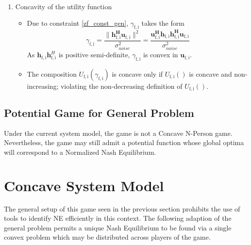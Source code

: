 \documentclass[12pt,a4paper]{report}
\begin{document}
\begin{enumerate}
\item Concavity of the utility function
\begin{itemize}
\item 
Due to constraint \eqref{zf_const_gen}, $\gamma_{\mathrm{f,i}}$ takes the form
	\begin{equation}\label{zf_snr}
	\gamma_{\mathrm{f,i}} = \frac{\|\mathbf{h^H_{\mathrm{f,i}}u_{\mathrm{f,i}}}\|^2}
	{\sigma^2_{noise}  
	}
	= 
	\frac{\mathbf{u^H_{\mathrm{f,i}}h_{\mathrm{f,i}}h^H_{\mathrm{f,i}}u_{\mathrm{f,i}}}}
	{\sigma^2_{noise}  
	}
	\end{equation}
	As $\mathbf{h}_{\mathrm{f,i}}\mathbf{h}^H_{\mathrm{f,i}}$ is positive semi-definite, $\gamma_{\mathrm{f,i}}$ is convex in ${\mathbf{u}_{\mathrm{f,i}}}$. 
\item
The composition $U_{\mathrm{f,i}}(\gamma_{\mathrm{f,i}}) $ is concave only if $U_{\mathrm{f,i}}() $ is concave and non-increasing; violating the non-decreasing definition of $U_{\mathrm{f,i}}() $.
\end{itemize}

\end{enumerate}

\subsection{Potential Game for General Problem}
Under the current system model, the game is not a Concave N-Person game. Nevertheless, the game may still admit a potential function whose global optima will correspond to a Normalized Nash Equilibrium.


\section{Concave System Model}\label{conmodel}

The general setup of this game seen in the previous section prohibits the use of tools to identify NE efficiently in this context. 
The following adaption of the general problem permits a unique Nash Equilibrium to be found via a single convex problem which may be distributed across players of the game.
\end{document}
